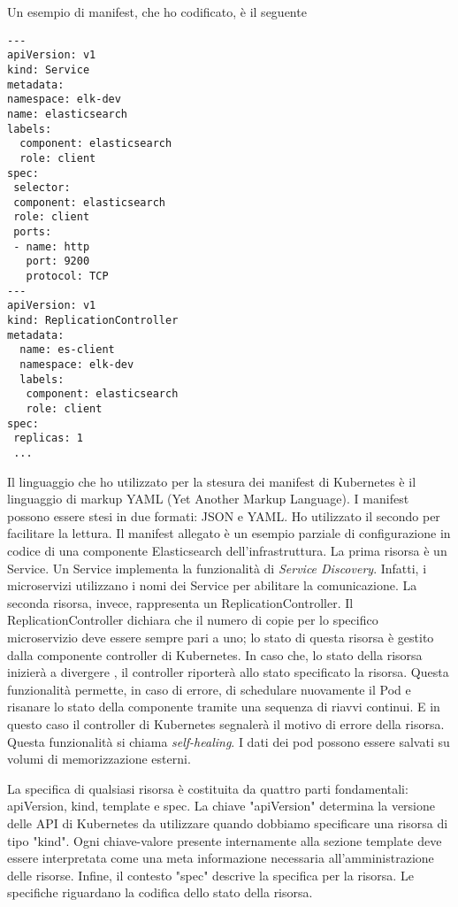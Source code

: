 Un esempio di manifest, che ho codificato, è il seguente

\begin{verbatim}
---
apiVersion: v1
kind: Service
metadata:
namespace: elk-dev
name: elasticsearch
labels:
  component: elasticsearch
  role: client
spec:
 selector:
 component: elasticsearch
 role: client
 ports:
 - name: http
   port: 9200
   protocol: TCP
---
apiVersion: v1
kind: ReplicationController
metadata:
  name: es-client
  namespace: elk-dev
  labels:
   component: elasticsearch
   role: client
spec:
 replicas: 1
 ...

\end{verbatim}

Il linguaggio che ho utilizzato per la 
stesura dei manifest di Kubernetes è il linguaggio 
di markup YAML (Yet Another Markup Language). I manifest 
possono essere stesi in due formati: JSON e YAML. Ho utilizzato
il secondo per facilitare la lettura. Il manifest 
allegato è un esempio parziale di 
configurazione in codice di una componente Elasticsearch 
dell'infrastruttura. La prima risorsa è un Service. 
Un Service implementa la funzionalità di \textit{Service Discovery}. 
Infatti, i microservizi utilizzano i nomi dei Service per abilitare
la comunicazione. La seconda risorsa, invece, rappresenta un 
ReplicationController. Il ReplicationController dichiara che il 
numero di copie per lo specifico microservizio deve essere sempre 
pari a uno; lo stato di questa risorsa è gestito dalla componente 
controller di Kubernetes. In caso che, lo stato della
risorsa inizierà a divergere , il controller riporterà allo stato
specificato la risorsa. Questa funzionalità permette, in caso di errore, 
di schedulare nuovamente il Pod e risanare lo stato della componente tramite 
una sequenza di riavvi continui. E in questo caso il controller 
di Kubernetes segnalerà il motivo di errore della risorsa. Questa funzionalità 
si chiama \textit{self-healing}. 
I dati dei pod possono essere salvati su volumi di memorizzazione esterni. 

La specifica di qualsiasi risorsa è costituita 
da quattro parti fondamentali: apiVersion, kind, template e spec. 
La chiave "apiVersion" determina la versione delle API di Kubernetes 
da utilizzare quando dobbiamo specificare una risorsa di tipo "kind".
Ogni chiave-valore presente internamente alla sezione template deve 
essere interpretata come una meta informazione necessaria all'amministrazione 
delle risorse. Infine, il contesto "spec" descrive la specifica per la risorsa.
Le specifiche riguardano la codifica dello stato della risorsa.

